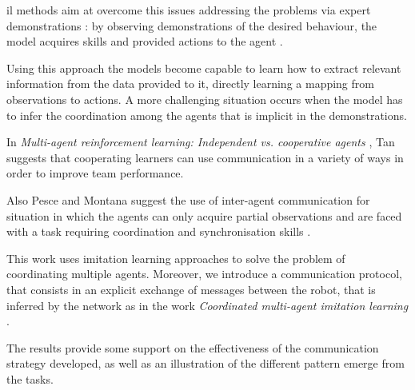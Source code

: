 \gls{il} methods \cite[see][]{schaal1999imitation, stepputtis2019imitation} aim at 
overcome this issues addressing the problems via expert demonstrations 
\cite[][]{song2018multi}: by observing demonstrations of the desired behaviour, 
the model acquires skills and provided actions to the agent 
\cite[][]{zhang2018deep, billard2008survey}.

Using this approach the models become capable to learn how to extract relevant 
information from the data provided to it, directly learning a mapping from 
observations to actions. 
A more challenging situation occurs when the model has to infer the coordination 
among the agents that is implicit in the demonstrations.

In \emph{Multi-agent reinforcement learning: Independent vs. cooperative 
agents} \cite[][]{tan1993multi}, Tan suggests that cooperating learners can use 
communication in a variety of ways in order to improve team performance. 

Also Pesce and Montana suggest the use of inter-agent communication for 
situation in which the agents can only acquire partial observations and are faced 
with a task requiring coordination and synchronisation skills 
\cite[][]{pesce2019improving}.


This work uses imitation learning approaches to solve the problem of 
coordinating multiple agents. Moreover, we introduce a communication protocol, 
that consists in an explicit exchange of messages between the robot, that is 
inferred by the network as in the work \emph{Coordinated multi-agent imitation 
learning} \cite[][]{le2017coordinated}. 

The results provide some support on the effectiveness of the communication 
strategy developed, as well as an illustration of the different pattern emerge from 
the tasks.


